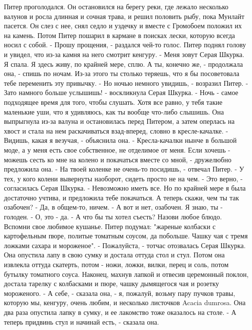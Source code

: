     Питер проголодался. Он остановился на берегу реки, где лежало 
несколько валунов и росла длинная и сочная трава, и решил половить 
рыбу, пока Мунлайт пасется. Он слез с нее, снял седло и уздечку и 
вместе с Громобоем положил их на камень. Потом Питер пошарил в кармане 
в поисках лески, которую всегда носил с собой.
    - Прошу прощения, - раздался чей-то голос. Питер поднял голову и 
увидел, что из-за камня на него смотрит кенгуру.
    - Меня зовут Серая Шкурка. Я спала. Я здесь живу, по крайней мере, 
сплю. А ты, конечно же, - продолжала она, - спишь по ночам. Из-за 
этого ты столько теряешь, что я бы посоветовала тебе переменить эту 
привычку.
    - Но ночью немного увидишь, - возразил Питер.
    - Зато намного больше услышишь! - воскликнула Серая Шкурка. - Ночь 
- самое подходящее время для того, чтобы слушать. Хотя все равно, у 
тебя такие маленькие уши, что я удивляюсь, как ты вообще что-либо 
слышишь.
    Она выпрыгнула из-за валуна и остановилась перед Питером, а затем 
оперлась на хвост и стала на нем раскачиваться взад-вперед, словно в 
кресле-качалке.
    - Видишь, какая я везучая, - объяснила она. - Кресла-качалки нынче 
в большой моде, а у меня есть свое собственное, не отделимое от меня. 
Если хочешь - можешь сесть ко мне на колено и покачаться вместе со 
мной, - дружелюбно предложила она.
    - На твоей коленке не очень-то посидишь, - отвечал Питер. - У тех, 
у кого колени вывернуты наоборот, сидеть просто не на чем.
    - Это верно, - согласилась Серая Шкурка. - Невозможно иметь все. 
Но по крайней мере я была достаточно учтива, и предложила тебе 
покачаться. А теперь скажи, чем ты так озабочен?
    - Да, в общем-то, ничем.
    - А вот и нет, озабочен. Я знаю, ты - голоден.
    - О, это - да.
    - А что бы ты хотел съесть? Назови любое блюдо. Вспомни свое 
любимое кушанье.
    Питер подумал: "жареные колбаски с картофельным пюре, политые 
томатным соусом, да побольше. Чашку чая с тремя ложками сахара и 
мороженое".
    - Пожалуйста, - тотчас отозвалась Серая Шкурка. Она опустила лапу 
в свою сумку и достала оттуда стол и стул. Потом она извлекла оттуда 
скатерть, потом - ножи, ложки, вилки, перец и соль, потом бутылку 
томатного соуса. Наконец, махнув лапкой и отвесив церемонный поклон, 
достала тарелку с колбасками и пюре, чашку дымящегося чая и розетку 
мороженого.
    - А себе, - сказала она, - я, пожалуй, возьму пару пучков травы, 
которую мы, кенгуру, очень любим, и несколько листочков Acacia 
dumrosa.
    Она два раза опустила лапку в сумку, и ее лакомство тоже оказалось 
на столе.
    - А теперь придвинь стул и начинай есть, - сказала она.
